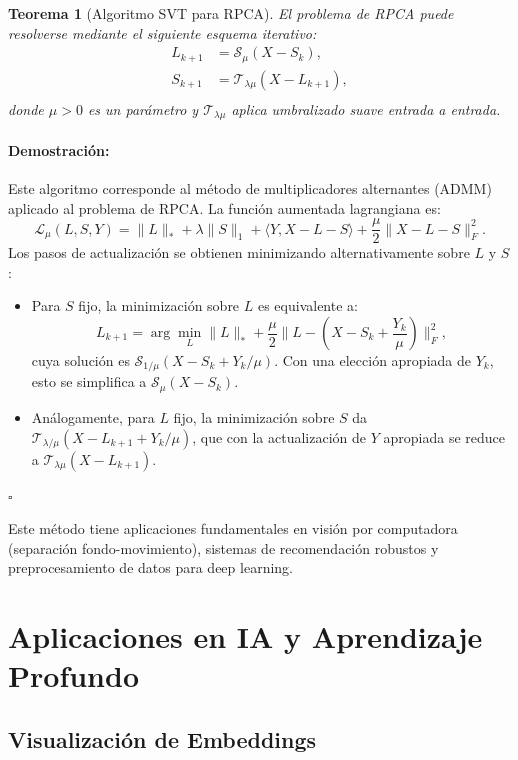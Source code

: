 \documentclass[11pt]{article}
\theoremstyle{plain}
\newtheorem{theorem}{Teorema}[section]
\newenvironment{proof}{\paragraph{Demostración:}}{\hfill$\square$}
\begin{document}
\begin{theorem}[Algoritmo SVT para RPCA]
\label{thm:svt}
El problema de RPCA puede resolverse mediante el siguiente esquema iterativo:
\[
\begin{aligned}
L_{k+1} &= \mathcal{S}_{\mu}(X - S_k), \\
S_{k+1} &= \mathcal{T}_{\lambda\mu}(X - L_{k+1}), \\
\end{aligned}
\]
donde $\mu > 0$ es un parámetro y $\mathcal{T}_{\lambda\mu}$ aplica umbralizado suave entrada a entrada.
\end{theorem}

\begin{proof}
Este algoritmo corresponde al método de multiplicadores alternantes (ADMM) aplicado al problema de RPCA. La función aumentada lagrangiana es:
\[
\mathcal{L}_\mu(L, S, Y) = \|L\|_* + \lambda\|S\|_1 + \langle Y, X - L - S \rangle + \frac{\mu}{2}\|X - L - S\|_F^2.
\]
Los pasos de actualización se obtienen minimizando alternativamente sobre $L$ y $S$:

\begin{itemize}
    \item Para $S$ fijo, la minimización sobre $L$ es equivalente a:
    \[
    L_{k+1} = \arg\min_L \|L\|_* + \frac{\mu}{2}\|L - (X - S_k + \frac{Y_k}{\mu})\|_F^2,
    \]
    cuya solución es $\mathcal{S}_{1/\mu}(X - S_k + Y_k/\mu)$. Con una elección apropiada de $Y_k$, esto se simplifica a $\mathcal{S}_\mu(X - S_k)$.
    
    \item Análogamente, para $L$ fijo, la minimización sobre $S$ da $\mathcal{T}_{\lambda/\mu}(X - L_{k+1} + Y_k/\mu)$, que con la actualización de $Y$ apropiada se reduce a $\mathcal{T}_{\lambda\mu}(X - L_{k+1})$.
\end{itemize}
\end{proof}

Este método tiene aplicaciones fundamentales en visión por computadora (separación fondo-movimiento), sistemas de recomendación robustos y preprocesamiento de datos para deep learning.

\section{Aplicaciones en IA y Aprendizaje Profundo}

\subsection{Visualización de Embeddings}
\end{document}
